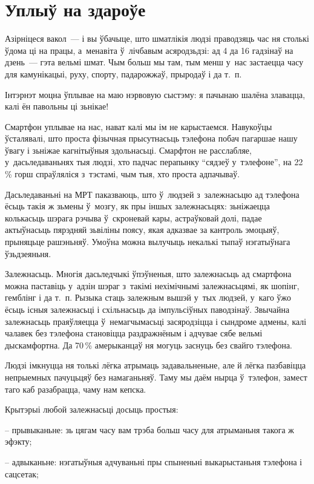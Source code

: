 \section{Уплыў на здароўе}

Азірніцеся вакол~--- і вы ўбачыце, што шматлікія людзі праводзяць час ня столькі ўдома ці на працы, а~менавіта ў~лічбавым асяродзьдзі: ад 4 да 16 гадзінаў на дзень~--- гэта вельмі шмат. Чым больш мы там, тым менш у~нас застаецца часу для камунікацыі, руху, спорту, падарожжаў, прыродаў і да т.~п.

Інтэрнэт моцна ўплывае на маю нэрвовую сыстэму: я пачынаю шалёна злавацца, калі ён павольны ці зьнікае!

Смартфон уплывае на нас, нават калі мы ім не карыстаемся. Навукоўцы ўсталявалі, што проста фізычная прысутнасьць тэлефона побач пагаршае нашу ўвагу і зьніжае кагнітыўныя здольнасьці. Смарфтон не расслабляе, у~дасьледаваньнях тыя людзі, хто падчас перапынку ``сядзеў у~тэлефоне'', на 22\,\% горш спраўляліся з~тэстамі, чым тыя, хто проста адпачываў.

Дасьледаваньні на МРТ паказваюць, што ў~людзей з~залежнасьцю ад тэлефона ёсьць такія ж зьмены ў~мозгу, як пры іншых залежнасьцях: зьніжаецца колькасьць шэрага рэчыва ў~скроневай кары, астраўковай долі, падае актыўнасьць пярэдняй зьвіліны поясу, якая адказвае за кантроль эмоцыяў, прыняцьце рашэньняў. Умоўна можна вылучыць некалькі тыпаў нэгатыўнага ўзьдзеяньня.

Залежнасьць. Многія дасьледчыкі ўпэўненыя, што залежнасьць ад смартфона можна паставіць у~адзін шэраг з~такімі нехімічнымі залежнасьцямі, як шопінг, гемблінг і да т.~п. Рызыка стаць залежным вышэй у~тых людзей, у~каго ўжо ёсьць існыя залежнасьці і схільнасьць да імпульсіўных паводзінаў. Звычайна залежнасьць праяўляецца ў~немагчымасьці засяродзіцца і сындроме адмены, калі чалавек без тэлефона становіцца раздражнёным і адчувае сябе вельмі дыскамфортна. Да 70\,\% амерыканцаў ня могуць заснуць без свайго тэлефона. 

Людзі імкнуцца ня толькі лёгка атрымаць задавальненьне, але й лёгка пазбавіцца непрыемных пачуцьцяў без намаганьняў. Таму мы даём нырца ў~тэлефон, замест таго каб разабрацца, чаму нам кепска.

Крытэрыі любой залежнасьці досыць простыя: 

– прывыканьне: зь цягам часу вам трэба больш часу для атрыманьня такога ж эфэкту;

– адвыканьне: нэгатыўныя адчуваньні пры спыненьні выкарыстаньня тэлефона і сацсетак;

